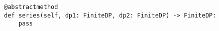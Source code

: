 \begin{verbatim}
@abstractmethod
def series(self, dp1: FiniteDP, dp2: FiniteDP) -> FiniteDP:
    pass
\end{verbatim}